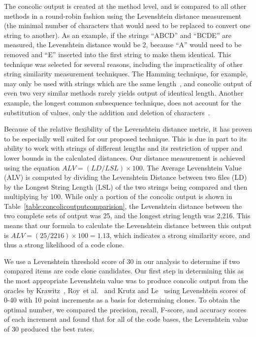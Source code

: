 \documentclass{sig-alternate}
\begin{document}
The concolic output is created at the method level, and is compared to all other methods in a round-robin fashion using the Levenshtein distance measurement (the minimal number of characters that would need to be replaced to convert one string to another). As an example, if the strings ``ABCD'' and ``BCDE'' are measured, the Levenshtein distance would be 2, because ``A'' would need to be removed and ``E'' inserted into the first string to make them identical. This technique was selected for several reasons, including the impracticality of other string similarity measurement techniques. The Hamming technique, for example, may only be used with strings which are the same length~\cite{Ros:2005:PRR:1086297.1086311, Jain:2012:HES:2324796.2324820}, and concolic output of even two very similar methods rarely yields output of identical length. Another example, the longest common subsequence technique, does not account for the substitution of values, only the addition and deletion of characters~\cite{Li:2008:SEA:1593105.1593164}.

Because of the relative flexibility of the Levenshtein distance metric, it has proven to be especially well suited for our proposed technique. This is due in part to its ability to work with strings of different lengths and its restriction of upper and lower bounds in the calculated distances. Our distance measurement is achieved using the equation $ALV = (LD/LSL) \times 100$. The Average Levenshtein Value (ALV) is computed by dividing the Levenshtein Distance between two files (LD) by the Longest String Length (LSL) of the two strings being compared and then multiplying by 100. While only a portion of the concolic output is shown in Table~\ref{table:concolicoutputcomparision}, the Levenshtein distance between the two complete sets of output was 25, and the longest string length was 2,216. This means that our formula to calculate the Levenshtein distance between this output is $ALV = (25/2216) \times 100 = 1.13$, which indicates a strong similarity score, and thus a strong likelihood of a code clone.


We use a Levenshtein threshold score of 30 in our analysis to determine if two compared items are code clone candidates. Our first step in determining this as the most appropriate Levenshtein value was to produce concolic output from the oracles by Krawitz~\cite{Kraw2012}, Roy~et al.~\cite{Roy:2009:CEC:1530898.1531101} and Krutz and Le~\cite{Krutz:2014:CCO:2597073.2597127} using Levenshtein scores of 0-40 with 10 point increments as a basis for determining clones. To obtain the optimal number, we compared the precision, recall, F-score, and accuracy scores of each increment and found that for all of the code bases, the Levenshtein value of 30 produced the best rates.
\end{document}
